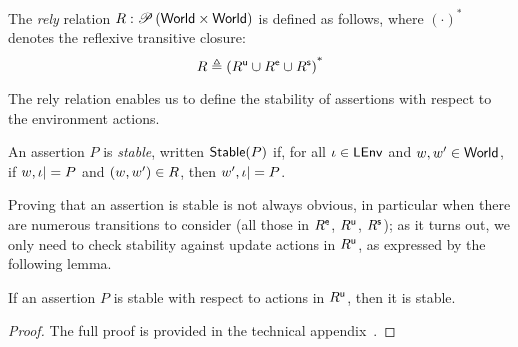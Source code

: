 \begin{definition}[Rely]
The \emph{rely} relation $R: \mathscr{P}\left(\mathsf{World} \times \mathsf{World} \right)$ is defined as follows, where $(\cdot)^{\text{*}}$ denotes the reflexive transitive closure:
%
\[
  R \triangleq  \left(R^{\textsf{u}} \cup R^{\textsf{e}} \cup R^{\textsf{s}} \right)^{\text{*}}
\]
%
\end{definition}

The rely relation enables us to define the stability of assertions with respect to the environment actions.
%
\begin{definition}[Stability]
An assertion $P$ is \emph{stable}, written \emph{$\mathsf{Stable}(P)$} if, for all $\iota \in \mathsf{LEnv}$ and $w, w' \in \mathsf{World}$, if $w, \iota |= P$ and $(w, w') \in R$, then $w', \iota |= P$.
\end{definition}
%
Proving that an assertion is stable is not always obvious, in particular when there are numerous transitions to consider (all those in $R^{\textsf{e}}$, $R^{\textsf{u}}$, $R^{\textsf{s}}$); as it turns out, we only need to check stability against update actions in $R^{\textsf{u}}$, as expressed by the following lemma.
%
\begin{lemma}[Stability]
If an assertion $P$ is stable with respect to actions in $R^{\textsf{u}}$, then it is stable. 
\begin{proof}
The full proof is provided in the technical appendix~\cite{colosl-tr14}.
\renewcommand{\qed}{}
\end{proof}
\end{lemma}
